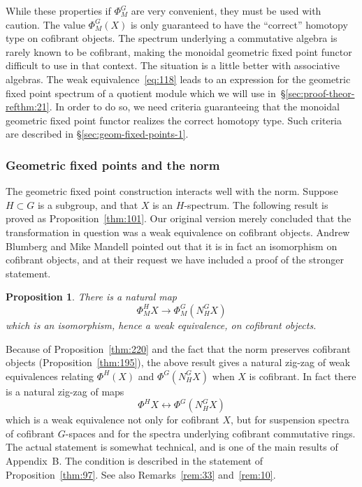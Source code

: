 \documentclass{amsart}
\newtheorem{prop}[equation]{Proposition}
\theoremstyle{definition}
\theoremstyle{remark}
\newcommand{\norm}{N}
\newcommand{\gfp}[1]{\Phi^{#1}}
\newcommand{\gfpm}[1]{\Phi_{M}^{#1}}
\newcommand{\phig}{\gfp{G}}
\newcommand{\phigm}{\gfpm{G}}
\newcommand{\phihm}{\gfpm{H}}
\newcommand{\phih}{\gfp{H}}
\begin{document}
While these properties if $\phigm$ are very convenient, they must be
used with caution.  The value $\phigm(X)$ is only guaranteed to have
the ``correct'' homotopy type on cofibrant objects.  The spectrum
underlying a commutative algebra is rarely known to be cofibrant,
making the monoidal geometric fixed point functor difficult to use in
that context.  The situation is a little better with associative
algebras.  The weak equivalence~\eqref{eq:118} leads to an expression
for the geometric fixed point spectrum of a quotient module which we
will use in~\S\ref{sec:proof-theor-refthm:21}.  In order to do so, we
need criteria guaranteeing that the monoidal geometric fixed point
functor realizes the correct homotopy type.  Such criteria are
described in \S\ref{sec:geom-fixed-points-1}.



\subsubsection{Geometric fixed points and the norm}

The geometric fixed point construction interacts well with the norm.
Suppose $H\subset G$ is a subgroup, and that $X$ is an $H$-spectrum.
The following result is proved as Proposition~\ref{thm:101}.  Our
original version merely concluded that the transformation in question
was a weak equivalence on cofibrant objects.  Andrew Blumberg and Mike
Mandell pointed out that it is in fact an isomorphism on cofibrant
objects, and at their request we have included a proof of the stronger
statement.

\begin{prop}
\label{thm:120}
There is a natural map
\[
\phihm X \to \phigm (\norm_{H}^{G} X)
\]
which is an isomorphism, hence a weak equivalence, on cofibrant objects.
\end{prop}


Because of Proposition~\ref{thm:220} and the fact that the norm
preserves cofibrant objects (Proposition~\ref{thm:195}), the above
result gives a natural zig-zag of weak equivalences relating
$\phih(X)$ and $\phig(\norm_{H}^{G}X)$ when $X$ is cofibrant.  In fact
there is a natural zig-zag of maps 
\[
\phih X \leftrightarrow \phig (\norm_{H}^{G} X)
\]
which is a weak equivalence not only for cofibrant $X$, but for
suspension spectra of cofibrant $G$-spaces and for the spectra
underlying cofibrant commutative rings.  The actual statement is
somewhat technical, and is one of the main results of Appendix~B.  The
condition is described in the statement of Proposition~\ref{thm:97}.
See also Remarks~\ref{rem:33} and~\ref{rem:10}.
\end{document}
